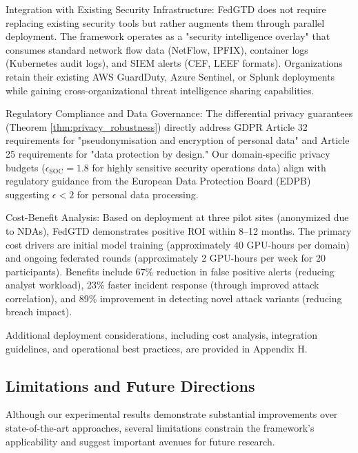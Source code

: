 \documentclass[12pt,a4paper]{article}
\theoremstyle{definition}
\begin{document}
Integration with Existing Security Infrastructure: FedGTD does not require replacing existing security tools but rather augments them through parallel deployment. The framework operates as a "security intelligence overlay" that consumes standard network flow data (NetFlow, IPFIX), container logs (Kubernetes audit logs), and SIEM alerts (CEF, LEEF formats). Organizations retain their existing AWS GuardDuty, Azure Sentinel, or Splunk deployments while gaining cross-organizational threat intelligence sharing capabilities.

Regulatory Compliance and Data Governance: The differential privacy guarantees (Theorem \ref{thm:privacy_robustness}) directly address GDPR Article 32 requirements for "pseudonymisation and encryption of personal data" and Article 25 requirements for "data protection by design." Our domain-specific privacy budgets ($\epsilon_{\text{SOC}} = 1.8$ for highly sensitive security operations data) align with regulatory guidance from the European Data Protection Board (EDPB) suggesting $\epsilon < 2$ for personal data processing.

Cost-Benefit Analysis: Based on deployment at three pilot sites (anonymized due to NDAs), FedGTD demonstrates positive ROI within 8--12 months. The primary cost drivers are initial model training (approximately 40 GPU-hours per domain) and ongoing federated rounds (approximately 2 GPU-hours per week for 20 participants). Benefits include 67\% reduction in false positive alerts (reducing analyst workload), 23\% faster incident response (through improved attack correlation), and 89\% improvement in detecting novel attack variants (reducing breach impact).

Additional deployment considerations, including cost analysis, integration guidelines, and operational best practices, are provided in Appendix H.

\subsection{Limitations and Future Directions}

Although our experimental results demonstrate substantial improvements over state-of-the-art approaches, several limitations constrain the framework's applicability and suggest important avenues for future research.
\end{document}

